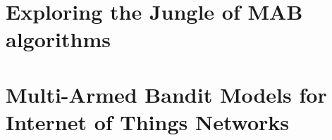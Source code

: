 \setcounter{mtc}{-1}
\adjustmtc

% 




\part{Exploring the Jungle of MAB algorithms}
\label{part:Introduction}








\part{Multi-Armed Bandit Models for Internet of Things Networks}
\label{part:MABIOT}











